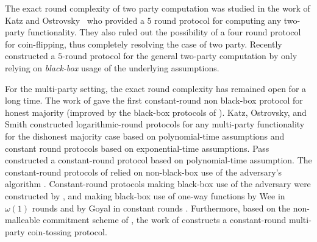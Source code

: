 The exact round complexity of two party computation was studied in the work of Katz and Ostrovsky~\cite{C:KatOst04} who provided a $5$ round protocol for computing any two-party functionality. They also ruled out the possibility of a four round protocol for coin-flipping, thus completely resolving the case of two party. Recently \cite{C:OstRicSca15} constructed a $5$-round protocol for the general two-party computation by only relying on \emph{black-box} usage of the underlying assumptions.



 
For the multi-party setting, the exact round complexity has remained open for a long time. The work of \cite{STOC:BeaMicRog90} gave the first constant-round non black-box protocol for honest majority (improved by the black-box protocols of \cite{C:DamIsh05,C:DamIsh06}). Katz, Ostrovsky, and Smith \cite{EC:KatOstSmi03} constructed logarithmic-round protocols for any multi-party functionality for the dishonest majority case based on polynomial-time assumptions and constant round protocols based on  exponential-time assumptions. Pass \cite{STOC:Pass04} 
constructed a constant-round protocol based on polynomial-time assumption. The constant-round protocols of \cite{EC:KatOstSmi03,STOC:Pass04} relied on non-black-box use of the adversary's algorithm \cite{FOCS:Barak01}. Constant-round protocols making black-box use of the adversary were constructed by \cite{C:PanPasVai08,STOC:LinPas11,STOC:Goyal11}, and making black-box use of one-way functions by Wee in $\omega(1)$ rounds \cite{FOCS:Wee10} and by Goyal in constant rounds \cite{STOC:Goyal11}. Furthermore, based on the non-malleable commitment scheme of \cite{STOC:Goyal11},  the work of \cite{FOCS:GLOV12} constructs a constant-round multi-party coin-tossing protocol.
 
